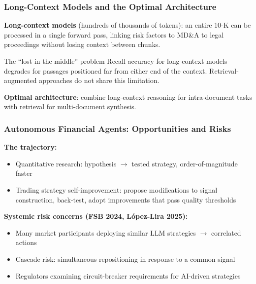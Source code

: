 \documentclass[9pt,t]{beamer}
\begin{document}
\begin{frame}
\frametitle{Long-Context Models and the Optimal Architecture}

\textbf{Long-context models} (hundreds of thousands of tokens): an entire 10-K can be processed in a single forward pass, linking risk factors to MD\&A to legal proceedings without losing context between chunks.

\medskip
\begin{alertblock}{The ``lost in the middle'' problem}
  Recall accuracy for long-context models degrades for passages positioned far from either end of the context. Retrieval-augmented approaches do not share this limitation.
\end{alertblock}

\medskip
\textbf{Optimal architecture}: combine long-context reasoning for intra-document tasks with retrieval for multi-document synthesis.
\end{frame}

\begin{frame}
\frametitle{Autonomous Financial Agents: Opportunities and Risks}

\textbf{The trajectory:}
\begin{itemize}
  \item Quantitative research: hypothesis $\to$ tested strategy, order-of-magnitude faster
  \item Trading strategy self-improvement: propose modifications to signal construction, back-test, adopt improvements that pass quality thresholds
\end{itemize}

\medskip
\textbf{Systemic risk concerns (FSB 2024, L\'{o}pez-Lira 2025):}
\begin{itemize}
  \item Many market participants deploying similar LLM strategies $\to$ correlated actions
  \item Cascade risk: simultaneous repositioning in response to a common signal
  \item Regulators examining circuit-breaker requirements for AI-driven strategies
\end{itemize}
\end{frame}
\end{document}
